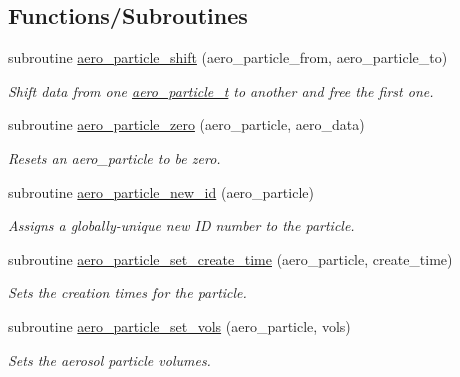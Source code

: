 \subsection*{Functions/\+Subroutines}
\begin{DoxyCompactItemize}
\item 
subroutine \mbox{\hyperlink{namespacepmc__aero__particle_a32b8b2f042b75f426babf6e12920f36c}{aero\+\_\+particle\+\_\+shift}} (aero\+\_\+particle\+\_\+from, aero\+\_\+particle\+\_\+to)
\begin{DoxyCompactList}\small\item\em Shift data from one \mbox{\hyperlink{structpmc__aero__particle_1_1aero__particle__t}{aero\+\_\+particle\+\_\+t}} to another and free the first one. \end{DoxyCompactList}\item 
subroutine \mbox{\hyperlink{namespacepmc__aero__particle_ae8b0ca357c00cbd9783ca52dcdf9e1ba}{aero\+\_\+particle\+\_\+zero}} (aero\+\_\+particle, aero\+\_\+data)
\begin{DoxyCompactList}\small\item\em Resets an aero\+\_\+particle to be zero. \end{DoxyCompactList}\item 
subroutine \mbox{\hyperlink{namespacepmc__aero__particle_ad693ed31a78df5bcc8df7bafaaeff5a0}{aero\+\_\+particle\+\_\+new\+\_\+id}} (aero\+\_\+particle)
\begin{DoxyCompactList}\small\item\em Assigns a globally-\/unique new ID number to the particle. \end{DoxyCompactList}\item 
subroutine \mbox{\hyperlink{namespacepmc__aero__particle_a11f426400953af4247cf3ff0ad05aedf}{aero\+\_\+particle\+\_\+set\+\_\+create\+\_\+time}} (aero\+\_\+particle, create\+\_\+time)
\begin{DoxyCompactList}\small\item\em Sets the creation times for the particle. \end{DoxyCompactList}\item 
subroutine \mbox{\hyperlink{namespacepmc__aero__particle_af4fbdf6ee50ec5fbaac1a10ea812cdc2}{aero\+\_\+particle\+\_\+set\+\_\+vols}} (aero\+\_\+particle, vols)
\begin{DoxyCompactList}\small\item\em Sets the aerosol particle volumes. \end{DoxyCompactList}\item 

\end{DoxyCompactItemize}
